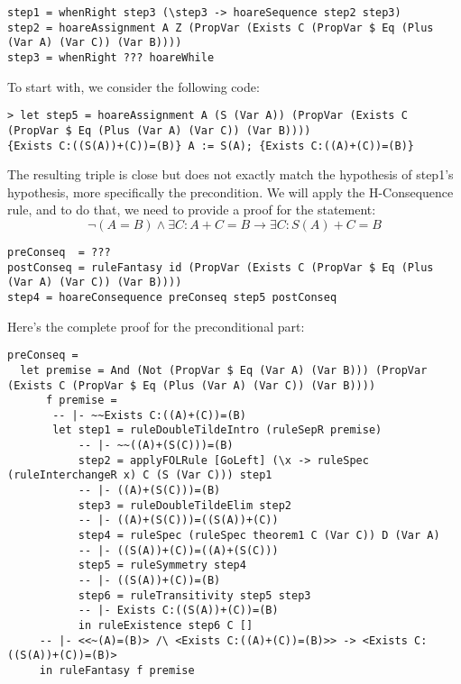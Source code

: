 \documentclass{article}
\begin{document}
\begin{lstlisting}
step1 = whenRight step3 (\step3 -> hoareSequence step2 step3)
step2 = hoareAssignment A Z (PropVar (Exists C (PropVar $ Eq (Plus (Var A) (Var C)) (Var B))))
step3 = whenRight ??? hoareWhile
\end{lstlisting}

To start with, we consider the following code:

\begin{lstlisting}
> let step5 = hoareAssignment A (S (Var A)) (PropVar (Exists C (PropVar $ Eq (Plus (Var A) (Var C)) (Var B))))
{Exists C:((S(A))+(C))=(B)} A := S(A); {Exists C:((A)+(C))=(B)}
\end{lstlisting}

The resulting triple is close but does not exactly match the hypothesis of step1's hypothesis, more specifically the precondition. We will apply the H-Consequence rule, and to do that, we need to provide a proof for the statement:
$$\neg (A = B) \land \exists C: A + C = B \to \exists C: S(A) + C = B$$

\begin{lstlisting}
preConseq  = ???
postConseq = ruleFantasy id (PropVar (Exists C (PropVar $ Eq (Plus (Var A) (Var C)) (Var B))))
step4 = hoareConsequence preConseq step5 postConseq
\end{lstlisting}

Here's the complete proof for the preconditional part:

\begin{lstlisting}
preConseq =
  let premise = And (Not (PropVar $ Eq (Var A) (Var B))) (PropVar (Exists C (PropVar $ Eq (Plus (Var A) (Var C)) (Var B))))
      f premise =
       -- |- ~~Exists C:((A)+(C))=(B)
       let step1 = ruleDoubleTildeIntro (ruleSepR premise)
           -- |- ~~((A)+(S(C)))=(B)
           step2 = applyFOLRule [GoLeft] (\x -> ruleSpec (ruleInterchangeR x) C (S (Var C))) step1
           -- |- ((A)+(S(C)))=(B)
           step3 = ruleDoubleTildeElim step2
           -- |- ((A)+(S(C)))=((S(A))+(C))
           step4 = ruleSpec (ruleSpec theorem1 C (Var C)) D (Var A)
           -- |- ((S(A))+(C))=((A)+(S(C)))
           step5 = ruleSymmetry step4
           -- |- ((S(A))+(C))=(B)
           step6 = ruleTransitivity step5 step3
           -- |- Exists C:((S(A))+(C))=(B)
           in ruleExistence step6 C []
     -- |- <<~(A)=(B)> /\ <Exists C:((A)+(C))=(B)>> -> <Exists C:((S(A))+(C))=(B)>
     in ruleFantasy f premise
\end{lstlisting}
\end{document}
